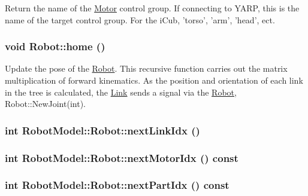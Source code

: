 Return the name of the \hyperlink{class_robot_model_1_1_motor}{Motor} control group. If connecting to YARP, this is the name of the target control group. For the iCub, 'torso', 'arm', 'head', ect. \hypertarget{class_robot_model_1_1_robot_a2fd7c2a0cd53593361f38f52de41d73c}{
\subsubsection[{home}]{\setlength{\rightskip}{0pt plus 5cm}void Robot::home ()}}
\label{class_robot_model_1_1_robot_a2fd7c2a0cd53593361f38f52de41d73c}


Update the pose of the \hyperlink{class_robot_model_1_1_robot}{Robot}. This recursive function carries out the matrix multiplication of forward kinematics. As the position and orientation of each link in the tree is calculated, the \hyperlink{class_robot_model_1_1_link}{Link} sends a signal via the \hyperlink{class_robot_model_1_1_robot}{Robot}, Robot::NewJoint(int). \hypertarget{class_robot_model_1_1_robot_a465bb3898172af37d6dec1885da0fec0}{
\subsubsection[{nextLinkIdx}]{\setlength{\rightskip}{0pt plus 5cm}int RobotModel::Robot::nextLinkIdx ()}}
\label{class_robot_model_1_1_robot_a465bb3898172af37d6dec1885da0fec0}
\hypertarget{class_robot_model_1_1_robot_ac9919cc40764e47d97fa591018bfbe67}{
\subsubsection[{nextMotorIdx}]{\setlength{\rightskip}{0pt plus 5cm}int RobotModel::Robot::nextMotorIdx () const}}
\label{class_robot_model_1_1_robot_ac9919cc40764e47d97fa591018bfbe67}
\hypertarget{class_robot_model_1_1_robot_ad2827f8919f3cce0d39b89fb3fb33217}{
\subsubsection[{nextPartIdx}]{\setlength{\rightskip}{0pt plus 5cm}int RobotModel::Robot::nextPartIdx () const}}
